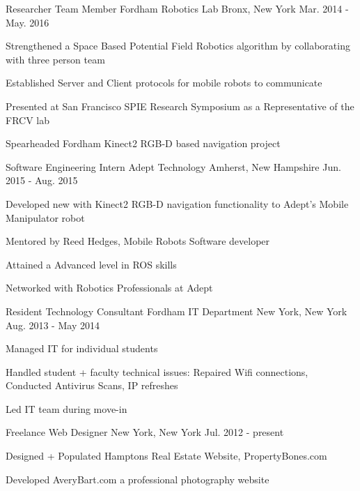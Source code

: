 \begin{cventries}
  \cventry
    {Researcher Team Member}
    {Fordham Robotics Lab}
    {Bronx, New York}
    {Mar. 2014 - May. 2016}
    {
      \begin{cvitems}
        \item {Strengthened a Space Based Potential Field Robotics algorithm by collaborating with three person team}
        \item {Established Server and Client protocols for mobile robots to communicate}
        \item {Presented at San Francisco SPIE Research Symposium as a Representative of the FRCV lab}
        \item{Spearheaded Fordham Kinect2 RGB-D based navigation project}
      \end{cvitems}
    }
  \cventry
    {Software Engineering Intern}
    {Adept Technology}
    {Amherst, New Hampshire}
    {Jun. 2015 - Aug. 2015}
    {
      \begin{cvitems}
        \item {Developed new with Kinect2 RGB-D navigation functionality to Adept’s Mobile Manipulator robot}
        \item {Mentored by Reed Hedges, Mobile Robots Software developer}
        \item {Attained a Advanced level in ROS skills}
        \item {Networked with Robotics Professionals at Adept}
      \end{cvitems}
    }
  \cventry
    {Resident Technology Consultant}
    {Fordham IT Department}
    {New York, New York}
    {Aug. 2013 - May 2014}
    {
      \begin{cvitems}
        \item {Managed IT for individual students}
        \item {Handled student + faculty technical issues:  Repaired Wifi connections, Conducted Antivirus Scans, IP refreshes}
        \item{Led IT team during move-in}
      \end{cvitems} 
    }
  \cventry
    {}
    {Freelance Web Designer}
    {New York, New York}
    {Jul. 2012 - present}
    {
      \begin{cvitems}
        \item {Designed + Populated Hamptons Real Estate Website, PropertyBones.com}
        \item{Developed AveryBart.com a professional photography website}

\end{cvitems}}
\end{cventries}
